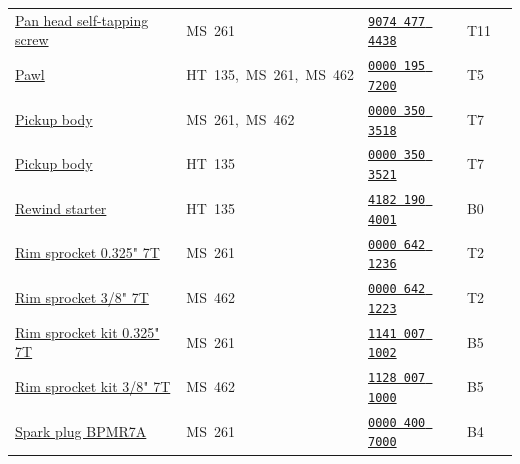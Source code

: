 \documentclass[10pt,letterpaper]{article}
\begin{document}
\begin{longtable}{@{}>{\raggedright\arraybackslash}p{3.18in}p{1.85in}p{1.30in}p{0.38in}r@{}}
\hyperlink{90744774438}{Pan head self-tapping screw} & \textcolor{frkApplication}{\mbox{MS 261}} & \hyperlink{90744774438}{\texttt{9074 477 4438}} & T11 & \pageref{part-90744774438}\\

\rowcolor{black!6}\hyperlink{00001957200}{Pawl} & \textcolor{frkApplication}{\mbox{HT 135, MS 261, MS 462}} & \hyperlink{00001957200}{\texttt{0000 195 7200}} & T5 & \pageref{part-00001957200}\\

\hyperlink{00003503518}{Pickup body} & \textcolor{frkApplication}{\mbox{MS 261, MS 462}} & \hyperlink{00003503518}{\texttt{0000 350 3518}} & T7 & \pageref{part-00003503518}\\

\rowcolor{black!6}\hyperlink{00003503521}{Pickup body} & \textcolor{frkApplication}{\mbox{HT 135}} & \hyperlink{00003503521}{\texttt{0000 350 3521}} & T7 & \pageref{part-00003503521}\\

\hyperlink{41821904001}{Rewind starter} & \textcolor{frkApplication}{\mbox{HT 135}} & \hyperlink{41821904001}{\texttt{4182 190 4001}} & B0 & \pageref{part-41821904001}\\

\rowcolor{black!6}\hyperlink{00006421236}{Rim sprocket 0.325" 7T} & \textcolor{frkApplication}{\mbox{MS 261}} & \hyperlink{00006421236}{\texttt{0000 642 1236}} & T2 & \pageref{part-00006421236}\\

\hyperlink{00006421223}{Rim sprocket 3/8" 7T} & \textcolor{frkApplication}{\mbox{MS 462}} & \hyperlink{00006421223}{\texttt{0000 642 1223}} & T2 & \pageref{part-00006421223}\\

\rowcolor{black!6}\hyperlink{11410071002}{Rim sprocket kit 0.325" 7T} & \textcolor{frkApplication}{\mbox{MS 261}} & \hyperlink{11410071002}{\texttt{1141 007 1002}} & B5 & \pageref{part-11410071002}\\

\hyperlink{11280071000}{Rim sprocket kit 3/8" 7T} & \textcolor{frkApplication}{\mbox{MS 462}} & \hyperlink{11280071000}{\texttt{1128 007 1000}} & B5 & \pageref{part-11280071000}\\

\rowcolor{black!6}\hyperlink{00004007000}{Spark plug BPMR7A} & \textcolor{frkApplication}{\mbox{MS 261}} & \hyperlink{00004007000}{\texttt{0000 400 7000}} & B4 & \pageref{part-00004007000}\\


\end{longtable}
\end{document}
